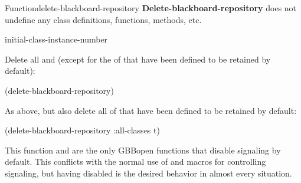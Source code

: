 \documentclass[10pt,twoside,english,pdftex]{article}
\begin{document}
\begin{functiondoc}{Function}{delete-blackboard-repository}
\textbf{Delete-blackboard-repository} does not undefine any class
definitions, functions, methods, etc.

\begin{alsos}{initial-class-instance-number}
\end{alsos}

\fnexamples 

Delete all  and 
(except for the  of  that have been
defined to be retained by default):
%
\W\supp
\begin{example}
  (delete-blackboard-repository)
\end{example}
%
As above, but also delete all  of 
that have been defined to be retained by default:
%
\W\supp\notpretop
\begin{example}
  (delete-blackboard-repository :all-classes t)
\end{example}

\fnnote 
{}%
%
This function and \textbf{} are the only GBBopen
functions that disable  signaling by default.  This conflicts
with the normal use of \textbf{} and
\textbf{} macros for controlling
 signaling, but having  disabled is the desired
behavior in almost every  situation.

\end{functiondoc}

\end{document}

